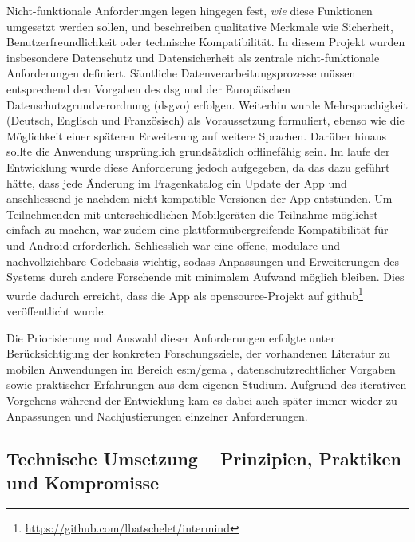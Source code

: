 Nicht-funktionale Anforderungen legen hingegen fest, \textit{wie} diese Funktionen umgesetzt werden sollen, und beschreiben qualitative Merkmale wie Sicherheit, Benutzerfreundlichkeit oder technische Kompatibilität. In diesem Projekt wurden insbesondere Datenschutz und Datensicherheit als zentrale nicht-funktionale Anforderungen definiert. Sämtliche Datenverarbeitungsprozesse müssen entsprechend den Vorgaben des \acrfull{dsg} und der Europäischen Datenschutzgrundverordnung (\acrshort{dsgvo}) erfolgen. Weiterhin wurde Mehrsprachigkeit (Deutsch, Englisch und Französisch) als Voraussetzung formuliert, ebenso wie die Möglichkeit einer späteren Erweiterung auf weitere Sprachen. Darüber hinaus sollte die Anwendung ursprünglich grundsätzlich offlinefähig sein. Im laufe der Entwicklung wurde diese Anforderung jedoch aufgegeben, da das dazu geführt hätte, dass jede Änderung im Fragenkatalog ein Update der App und anschliessend je nachdem nicht kompatible Versionen der App entstünden. Um Teilnehmenden mit unterschiedlichen Mobilgeräten die Teilnahme möglichst einfach zu machen, war zudem eine plattformübergreifende Kompatibilität für  und Android erforderlich. Schliesslich war eine offene, modulare und nachvollziehbare Codebasis wichtig, sodass Anpassungen und Erweiterungen des Systems durch andere Forschende mit minimalem Aufwand möglich bleiben. Dies wurde dadurch erreicht, dass die App als \gls{opensource}-Projekt auf \gls{github}\footnote{\href{https://github.com/lbatschelet/intermind}{https://github.com/lbatschelet/intermind}} veröffentlicht wurde.

Die Priorisierung und Auswahl dieser Anforderungen erfolgte unter Berücksichtigung der konkreten Forschungsziele, der vorhandenen Literatur zu mobilen Anwendungen im Bereich \gls{esm}/\gls{gema} \parencite[u.a.][]{chenPerceivedUrbanEnvironment2025, bakolisUrbanMindUsing2018, randallDevelopmentTrialMobile2013}, datenschutzrechtlicher Vorgaben sowie praktischer Erfahrungen aus dem eigenen Studium. Aufgrund des iterativen Vorgehens während der Entwicklung kam es dabei auch später immer wieder zu Anpassungen und Nachjustierungen einzelner Anforderungen.

\subsection{Technische Umsetzung -- Prinzipien, Praktiken und Kompromisse}

